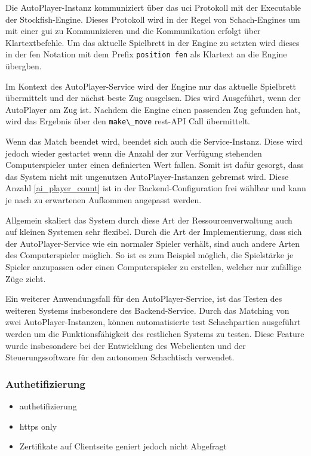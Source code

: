 Die AutoPlayer-Instanz kommuniziert über das \gls{uci}
Protokoll\cite{uciprotocol} mit der Executable der Stockfish-Engine.
Dieses Protokoll wird in der Regel von Schach-Engines um mit einer
\gls{gui} zu Kommunizieren und die Kommunikation erfolgt über
Klartextbefehle. Um das aktuelle Spielbrett in der Engine zu setzten
wird dieses in der \gls{fen} Notation mit dem Prefix
\passthrough{\lstinline!position fen!} als Klartext an die Engine
übergben.

Im Kontext des AutoPlayer-Service wird der Engine nur das aktuelle
Spielbrett übermittelt und der nächst beste Zug ausgelsen. Dies wird
Ausgeführt, wenn der AutoPlayer am Zug ist. Nachdem die Engine einen
passenden Zug gefunden hat, wird das Ergebnis über den
\passthrough{\lstinline!make\_move!} \gls{rest}-API Call übermittelt.

Wenn das Match beendet wird, beendet sich auch die Service-Instanz.
Diese wird jedoch wieder gestartet wenn die Anzahl der zur Verfügung
stehenden Computerspieler unter einen definierten Wert fallen. Somit ist
dafür gesorgt, dass das System nicht mit ungenutzen AutoPlayer-Instanzen
gebremst wird. Diese Anzahl \ref{ai_player_count} ist in der
Backend-Configuration frei wählbar und kann je nach zu erwartenen
Aufkommen angepasst werden.

Allgemein skaliert das System durch diese Art der Ressourcenverwaltung
auch auf kleinen Systemen sehr flexibel. Durch die Art der
Implementierung, dass sich der AutoPlayer-Service wie ein normaler
Spieler verhält, sind auch andere Arten des Computerspieler möglich. So
ist es zum Beispiel möglich, die Spielstärke je Spieler anzupassen oder
einen Computerspieler zu erstellen, welcher nur zufällige Züge zieht.

Ein weiterer Anwendungsfall für den AutoPlayer-Service, ist das Testen
des weiteren Systems insbesondere des Backend-Service. Durch das
Matching von zwei AutoPlayer-Instanzen, können automatisierte test
Schachpartien ausgeführt werden um die Funktionsfähigkeit des restlichen
Systems zu testen. Diese Feature wurde insbesondere bei der Entwicklung
des Webclienten und der Steuerungssoftware für den autonomen Schachtisch
verwendet.

\hypertarget{authetifizierung}{%
\subsubsection{Authetifizierung}\label{authetifizierung}}

\begin{itemize}
\tightlist
\item
  authetifizierung
\item
  https only
\item
  Zertifikate auf Clientseite geniert jedoch nicht Abgefragt
\end{itemize}

